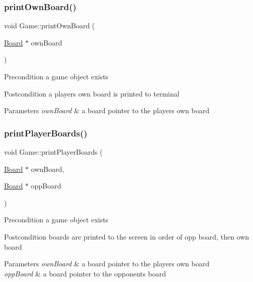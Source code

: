 \subsubsection{\texorpdfstring{print\+Own\+Board()}{printOwnBoard()}}
{\footnotesize\ttfamily void Game\+::print\+Own\+Board (\begin{DoxyParamCaption}\item[{\hyperlink{classBoard}{Board} $\ast$}]{own\+Board }\end{DoxyParamCaption})}

\begin{DoxyPrecond}{Precondition}
a game object exists 
\end{DoxyPrecond}
\begin{DoxyPostcond}{Postcondition}
a player\textquotesingle{}s own board is printed to terminal 
\end{DoxyPostcond}

\begin{DoxyParams}{Parameters}
{\em own\+Board} & a board pointer to the player\textquotesingle{}s own board \\
\hline
\end{DoxyParams}
\mbox{\label{classGame_a5d46e31df48c320c905bf23833e75bfd}} 
\subsubsection{\texorpdfstring{print\+Player\+Boards()}{printPlayerBoards()}}
{\footnotesize\ttfamily void Game\+::print\+Player\+Boards (\begin{DoxyParamCaption}\item[{\hyperlink{classBoard}{Board} $\ast$}]{own\+Board,  }\item[{\hyperlink{classBoard}{Board} $\ast$}]{opp\+Board }\end{DoxyParamCaption})}

\begin{DoxyPrecond}{Precondition}
a game object exists 
\end{DoxyPrecond}
\begin{DoxyPostcond}{Postcondition}
boards are printed to the screen in order of opp board, then own board 
\end{DoxyPostcond}

\begin{DoxyParams}{Parameters}
{\em own\+Board} & a board pointer to the player\textquotesingle{}s own board \\
\hline
{\em opp\+Board} & a board pointer to the opponent\textquotesingle{}s board \\
\hline
\end{DoxyParams}
\mbox{\label{classGame_afc66204a94ac13e910a4f371f9911e81}} 
